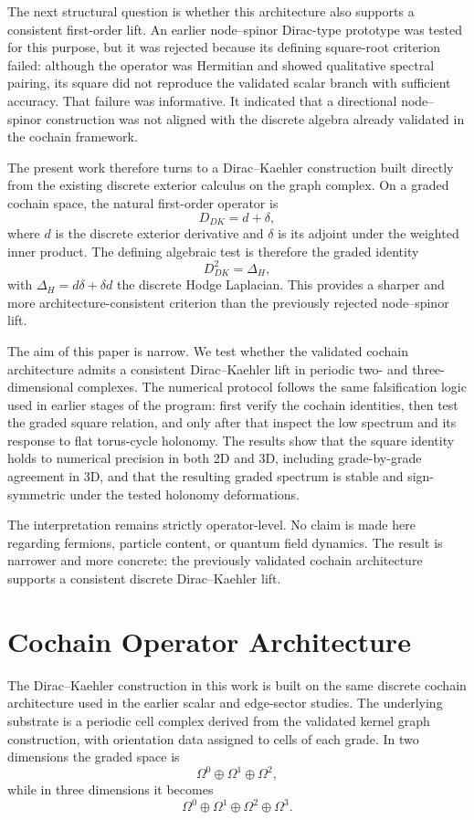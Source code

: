 \documentclass[11pt]{article}
\begin{document}
The next structural question is whether this architecture also supports a consistent first-order lift. An earlier node--spinor Dirac-type prototype was tested for this purpose, but it was rejected because its defining square-root criterion failed: although the operator was Hermitian and showed qualitative spectral pairing, its square did not reproduce the validated scalar branch with sufficient accuracy. That failure was informative. It indicated that a directional node--spinor construction was not aligned with the discrete algebra already validated in the cochain framework.

The present work therefore turns to a Dirac--Kaehler construction built directly from the existing discrete exterior calculus on the graph complex. On a graded cochain space, the natural first-order operator is
\[
D_{DK} = d + \delta,
\]
where $d$ is the discrete exterior derivative and $\delta$ is its adjoint under the weighted inner product. The defining algebraic test is therefore the graded identity
\[
D_{DK}^2 = \Delta_H,
\]
with $\Delta_H = d\delta + \delta d$ the discrete Hodge Laplacian. This provides a sharper and more architecture-consistent criterion than the previously rejected node--spinor lift.

The aim of this paper is narrow. We test whether the validated cochain architecture admits a consistent Dirac--Kaehler lift in periodic two- and three-dimensional complexes. The numerical protocol follows the same falsification logic used in earlier stages of the program: first verify the cochain identities, then test the graded square relation, and only after that inspect the low spectrum and its response to flat torus-cycle holonomy. The results show that the square identity holds to numerical precision in both 2D and 3D, including grade-by-grade agreement in 3D, and that the resulting graded spectrum is stable and sign-symmetric under the tested holonomy deformations.

The interpretation remains strictly operator-level. No claim is made here regarding fermions, particle content, or quantum field dynamics. The result is narrower and more concrete: the previously validated cochain architecture supports a consistent discrete Dirac--Kaehler lift.

\section{Cochain Operator Architecture}

The Dirac--Kaehler construction in this work is built on the same discrete cochain architecture used in the earlier scalar and edge-sector studies. The underlying substrate is a periodic cell complex derived from the validated kernel graph construction, with orientation data assigned to cells of each grade. In two dimensions the graded space is
\[
\Omega^0 \oplus \Omega^1 \oplus \Omega^2,
\]
while in three dimensions it becomes
\[
\Omega^0 \oplus \Omega^1 \oplus \Omega^2 \oplus \Omega^3.
\]
\end{document}
